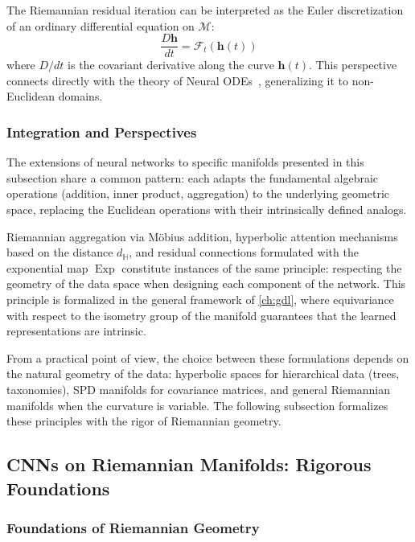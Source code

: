 \begin{remark}
The Riemannian residual iteration can be interpreted as the Euler discretization of an ordinary differential equation on $\mathcal{M}$:
\begin{equation}
\frac{D\mathbf{h}}{dt} = \mathcal{F}_t(\mathbf{h}(t))
\end{equation}
where $D/dt$ is the covariant derivative along the curve $\mathbf{h}(t)$. This perspective connects directly with the theory of Neural ODEs~\citep{chen2019neural}, generalizing it to non-Euclidean domains.
\end{remark}

\subsubsection{Integration and Perspectives}

The extensions of neural networks to specific manifolds presented in this subsection share a common pattern: each adapts the fundamental algebraic operations (addition, inner product, aggregation) to the underlying geometric space, replacing the Euclidean operations with their intrinsically defined analogs.

Riemannian aggregation via Möbius addition, hyperbolic attention mechanisms based on the distance $d_{\mathbb{H}}$, and residual connections formulated with the exponential map $\operatorname{Exp}$ constitute instances of the same principle: respecting the geometry of the data space when designing each component of the network. This principle is formalized in the general framework of \autoref{ch:gdl}, where equivariance with respect to the isometry group of the manifold guarantees that the learned representations are intrinsic.

From a practical point of view, the choice between these formulations depends on the natural geometry of the data: hyperbolic spaces for hierarchical data (trees, taxonomies), SPD manifolds for covariance matrices, and general Riemannian manifolds when the curvature is variable. The following subsection formalizes these principles with the rigor of Riemannian geometry.

\subsection{CNNs on Riemannian Manifolds: Rigorous Foundations}

\subsubsection{Foundations of Riemannian Geometry}

